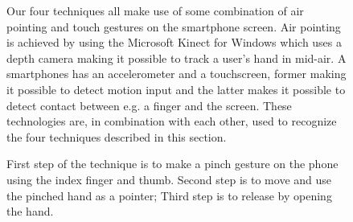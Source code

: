 \begin{figure}
\hspace{0.02\columnwidth}  
\caption{
	\protect{} First step of the \pinch technique is to make a pinch gesture on the phone using the index finger and thumb. Second step is to move and use the pinched hand as a pointer; 
	\protect{} Third step is to release by opening the hand. 
}
\label{fig:pinchTechnique}

Our four techniques all make use of some combination of air pointing and touch gestures on the smartphone screen.
Air pointing is achieved by using the Microsoft Kinect for Windows which uses a depth camera making it possible to track a user's hand in mid-air.
A smartphones has an accelerometer and a touchscreen, former making it possible to detect motion input and the latter makes it possible to detect contact between e.g. a finger and the screen.
These technologies are, in combination with each other, used to recognize the four techniques described in this section. 
\end{figure}